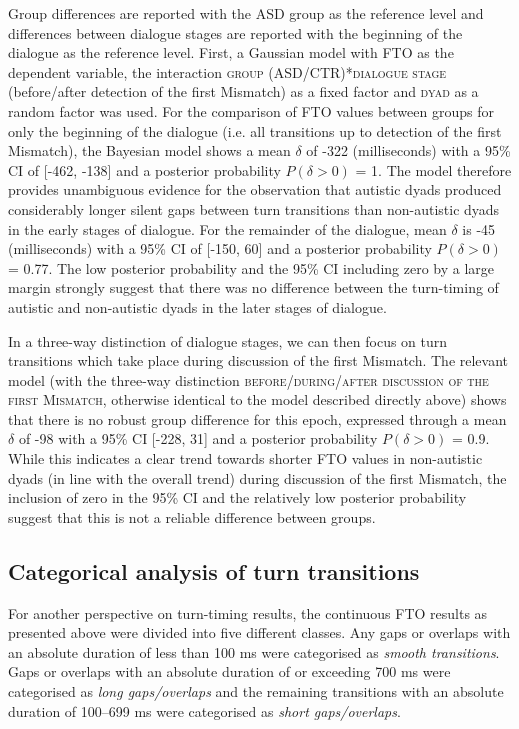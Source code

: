 Group differences are reported with the ASD group as the reference level and differences between dialogue stages are reported with the beginning of the dialogue as the reference level. First, a Gaussian model with FTO as the dependent variable, the interaction \textsc{group} (ASD/CTR)*\textsc{dialogue stage} (before/after detection of the first Mismatch) as a fixed factor and \textsc{dyad} as a random factor was used. For the comparison of FTO values between groups for only the beginning of the dialogue (i.e. all transitions up to detection of the first Mismatch), the Bayesian model shows a mean \(\delta\) of -322 (milliseconds) with a 95\% CI of {[}-462, -138{]} and a posterior probability \(P(\delta > 0)\) = 1. The model therefore provides unambiguous evidence for the observation that autistic dyads produced considerably longer silent gaps between turn transitions than non-autistic dyads in the early stages of dialogue. For the remainder of the dialogue, mean \(\delta\) is -45 (milliseconds) with a 95\% CI of {[}-150, 60{]} and a posterior probability \(P(\delta > 0)\) = 0.77. The low posterior probability and the 95\% CI including zero by a large margin strongly suggest that there was no difference between the turn-timing of autistic and non-autistic dyads in the later stages of dialogue.

In a three-way distinction of dialogue stages, we can then focus on turn transitions which take place during discussion of the first Mismatch. The relevant model (with the three-way distinction \textsc{before/during/after discussion of the first Mismatch}, otherwise identical to the model described directly above) shows that there is no robust group difference for this epoch, expressed through a mean \(\delta\) of -98 with a 95\% CI {[}-228, 31{]} and a posterior probability \(P(\delta > 0)\) = 0.9. While this indicates a clear trend towards shorter FTO values in non-autistic dyads (in line with the overall trend) during discussion of the first Mismatch, the inclusion of zero in the 95\% CI and the relatively low posterior probability suggest that this is not a reliable difference between groups.



\subsection{Categorical analysis of turn transitions}\label{turntaking_results_categorical}

For another perspective on turn-timing results, the continuous FTO results as presented above were divided into five different classes. Any gaps or overlaps with an absolute duration of less than 100 ms were categorised as \textit{smooth transitions}. Gaps or overlaps with an absolute duration of or exceeding 700 ms were categorised as \textit{long gaps/overlaps} and the remaining transitions with an absolute duration of 100--699 ms were categorised as \textit{short gaps/overlaps}.

